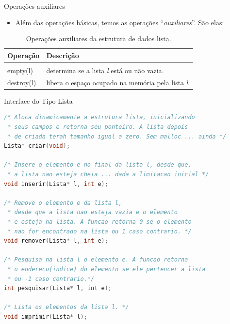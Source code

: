 \begin{frame}{Operações auxiliares}   
	\begin{itemize}
	\item Além das operações básicas, temos as operações ``\textit{auxiliares}''. São elas:
	\end{itemize}
	\begin{table}[!htpb]
	  \centering
	\begin{tabular}{l||l}
	    \hline \hline 
	 \textbf{Operação} & \textbf{Descrição} \\
	\hline \hline \\
	    \hline empty(l) & determina se a lista \textit{l} está ou não vazia.\\
	    \hline destroy(l) & libera o espaço ocupado na memória pela lista \textit{l}.\\
	    \hline \hline
	\end{tabular}
\caption{Operações auxiliares da estrutura de dados lista.}
\end{table}
 \end{frame}
 

\begin{frame}{Interface do Tipo Lista}
\footnotesize
\begin{lstlisting}[language=C]
/* Aloca dinamicamente a estrutura lista, inicializando 
 * seus campos e retorna seu ponteiro. A lista depois 
 * de criada terah tamanho igual a zero. Sem malloc ... ainda */
Lista* criar(void);

/* Insere o elemento e no final da lista l, desde que,
 * a lista nao esteja cheia ... dada a limitacao inicial */
void inserir(Lista* l, int e);

/* Remove o elemento e da lista l,
 * desde que a lista nao esteja vazia e o elemento
 * e esteja na lista. A funcao retorna 0 se o elemento 
 * nao for encontrado na lista ou 1 caso contrario. */
void remover(Lista* l, int e);

/* Pesquisa na lista l o elemento e. A funcao retorna 
 * o endereco(indice) do elemento se ele pertencer a lista
 * ou -1 caso contrario.*/
int pesquisar(Lista* l, int e);

/* Lista os elementos da lista l. */
void imprimir(Lista* l);
\end{lstlisting}
\end{frame}

